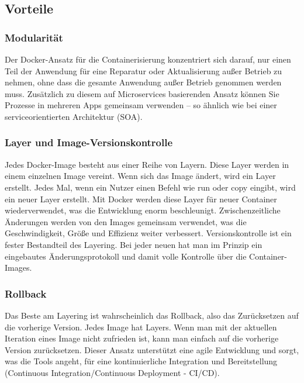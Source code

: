 \subsection{Vorteile}

\subsubsection{Modularität}

Der Docker-Ansatz für die Containerisierung konzentriert sich darauf, nur einen Teil der Anwendung für eine Reparatur oder Aktualisierung außer Betrieb zu nehmen, 
ohne dass die gesamte Anwendung außer Betrieb genommen werden muss. Zusätzlich zu diesem auf Microservices basierenden Ansatz können Sie Prozesse 
in mehreren Apps gemeinsam verwenden – so ähnlich wie bei einer serviceorientierten Architektur (SOA).
\cite{sysarch-docker-1}

\subsubsection{Layer und Image-Versionskontrolle}

Jedes Docker-Image besteht aus einer Reihe von Layern. Diese Layer werden in einem einzelnen Image vereint. Wenn sich das Image ändert, wird ein Layer erstellt. 
Jedes Mal, wenn ein Nutzer einen Befehl wie run oder copy eingibt, wird ein neuer Layer erstellt. Mit Docker werden diese Layer für neuer Container wiederverwendet, 
was die Entwicklung enorm beschleunigt. Zwischenzeitliche Änderungen werden von den Images gemeinsam verwendet, was die Geschwindigkeit, Größe und Effizienz weiter verbessert. 
Versionskontrolle ist ein fester Bestandteil des Layering. Bei jeder neuen hat man im Prinzip ein eingebautes Änderungsprotokoll und damit volle Kontrolle über die Container-Images.
\cite{sysarch-docker-1}

\subsubsection{Rollback}

Das Beste am Layering ist wahrscheinlich das Rollback, also das Zurücksetzen auf die vorherige Version. Jedes Image hat Layers. Wenn man mit der aktuellen Iteration eines Image nicht zufrieden ist, kann man einfach
auf die vorherige Version zurücksetzen. Dieser Ansatz unterstützt eine agile Entwicklung und sorgt, was die Tools angeht, 
für eine kontinuierliche Integration und Bereitstellung (Continuous Integration/Continuous Deployment - CI/CD).
\cite{sysarch-docker-1}

